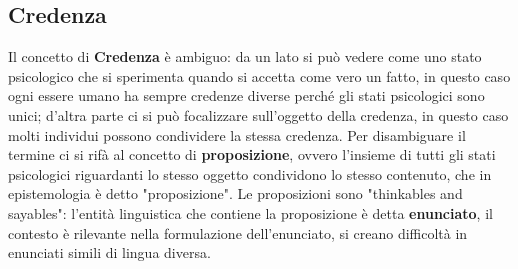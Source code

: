 \documentclass[10pt,a4paper]{article}
\begin{document}
\subsection{Credenza}
Il concetto di \textbf{Credenza} è ambiguo: da un lato si può vedere come uno stato psicologico che si sperimenta quando si accetta come vero un fatto, in questo caso ogni essere umano ha sempre credenze diverse perché gli stati psicologici sono unici; d'altra parte ci si può focalizzare sull'oggetto della credenza, in questo caso molti individui possono condividere la stessa credenza. Per disambiguare il termine ci si rifà al concetto di \textbf{proposizione}, ovvero l'insieme di tutti gli stati psicologici riguardanti lo stesso oggetto condividono lo stesso contenuto, che in epistemologia è detto "proposizione". Le proposizioni sono "thinkables and sayables": l'entità linguistica che contiene la proposizione è detta \textbf{enunciato}, il contesto è rilevante nella formulazione dell'enunciato, si creano difficoltà in enunciati simili di lingua diversa.
\end{document}
